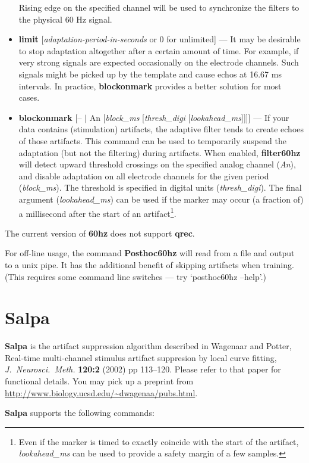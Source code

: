 \documentclass[12pt,oneside]{book}
\def\prog#1{{\bf #1}}
\def\cmd#1{{\bf #1}}
\def\arg#1{{\it #1}}
\begin{document}
\begin{itemize}
Rising edge on the specified channel will be used to synchronize the
filters to the physical 60 Hz signal.
\item \cmd{limit} [\arg{adaptation-period-in-seconds} or 0 for unlimited]
--- It may be desirable to stop adaptation altogether after a certain
amount of time. For example, if very strong signals are expected
occasionally on the electrode channels. Such signals might be picked
up by the template and cause echos at 16.67 ms intervals. In practice,
\cmd{blockonmark} provides a better solution for most cases.
\item \cmd{blockonmark} [-- $|$ An [\arg{block\_ms} [\arg{thresh\_digi}
[\arg{lookahead\_ms}]]]] --- If your data contains (stimulation) artifacts,
the adaptive filter tends to create echoes of those artifacts. This
command can be used to temporarily suspend the adaptation (but not the
filtering) during artifacts. When enabled, \prog{filter60hz} will
detect upward threshold crossings on the specified analog channel
(\arg{An}), and disable adaptation on all electrode channels for the
given period (\arg{block\_ms}). The threshold is specified in digital
units (\arg{thresh\_digi}). The final argument (\arg{lookahead\_ms})
can be used if the marker may occur (a fraction of) a millisecond
after the start of an artifact\footnote{Even if the marker is timed to
exactly coincide with the start of the artifact, \arg{lookahead\_ms} can be
used to provide a safety margin of a few samples.}.
\end{itemize}

The current version of \prog{60hz} does not support \cmd{qrec}.

For off-line usage, the command \prog{Posthoc60hz} will read from a file
and output to a unix pipe. It has the additional benefit of skipping
artifacts when training. (This requires some command line switches ---
try `posthoc60hz --help'.)

\section{Salpa}

\prog{Salpa} is the artifact suppression algorithm described in
Wagenaar and Potter, Real-time multi-channel stimulus artifact
suppresion by local curve fitting, \emph{J.\ Neurosci.\ Meth.} {\bf
120:2} (2002) pp 113--120\@. Please refer to that paper for functional
details. You may pick up a preprint from
\url{http://www.biology.ucsd.edu/~dwagenaa/pubs.html}.

\prog{Salpa} supports the following commands:
\end{document}
